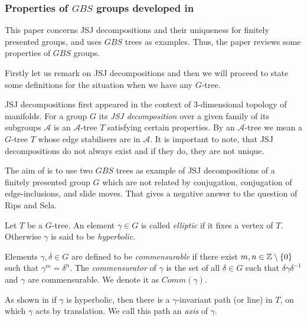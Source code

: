 \subsubsection{Properties of $GBS$ groups developed in \cite{For03}}
\label{JSJ} %
This paper concerns JSJ decompositions and their uniqueness for finitely presented groups, and uses $GBS$ trees as examples. Thus, the paper reviews some properties of $GBS$ groups.

Firstly let us remark on JSJ decompositions and then we will proceed to state some definitions for the situation when we have any $G$-tree.

\begin{remark}\cite{GuLe17}
    JSJ decompositions first appeared in the context of 3-dimensional topology of manifolds. For a group $G$ its \emph{JSJ decomposition} over a given family of its subgroups $\mathcal{A}$ is an $\mathcal{A}$-tree $T$ satisfying certain properties. By an $\mathcal{A}$-tree we mean a $G$-tree $T$ whose edge stabilisers are in $\mathcal{A}$. It is important to note, that JSJ decompositions do not always exist and if they do, they are not unique.

    The aim of \cite{For03} is to use two $GBS$ trees as example of JSJ decompositions of a finitely presented group $G$ which are not related by conjugation, conjugation of edge-inclusions, and slide moves. That gives a negative answer to the question of Rips and Sela.
\end{remark}

\begin{definition}
    Let $T$ be a $G$-tree. An element $\gamma \in G$ is called \emph{elliptic} if it fixes a vertex of $T$. Otherwise $\gamma$ is said to be \emph{hyperbolic}.
    
    Elements $\gamma,\delta \in G$ are defined to be \emph{commensurable} if there exist $m,n \in \mathbb{Z}\setminus \{0\}$ such that $\gamma^m = \delta^n$. The \emph{commensurator} of $\gamma$ is the set of all $\delta \in G$ such that $\delta\gamma\delta^{-1}$ and $\gamma$ are commensurable. We denote it as $Comm(\gamma)$.
\end{definition}

\begin{remark}
    As shown in \cite[Proposition 24]{Ser80} if $\gamma$ is hyperbolic, then there is a $\gamma$-invariant path (or line) in $T$, on which $\gamma$ acts by translation. We call this path an \emph{axis} of $\gamma$.
\end{remark}

